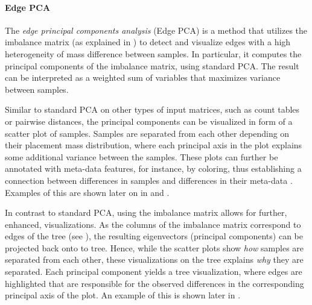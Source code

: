 
\paragraph{Edge PCA}
\label{ch:Foundations:sec:PhylogeneticPlacement:sub:ExistingMethods:par:EdgePCA}


The \emph{edge principal components analysis} (Edge PCA) \cite{Matsen2011a}
is a method that utilizes the imbalance matrix
(as explained in )
to detect and visualize edges with a high heterogeneity of mass difference between samples.
In particular, it computes the principal components of the imbalance matrix, using standard PCA.
The result can be interpreted as a weighted sum of variables that maximizes variance between samples.

Similar to standard PCA on other types of input matrices, such as count tables or pairwise distances,
the principal components can be visualized in form of a scatter plot of samples.
Samples are separated from each other depending on their placement mass distribution,
where each principal axis in the plot explains some additional variance between the samples.
These plots can further be annotated with meta-data features, for instance, by coloring,
thus establishing a connection between differences in samples and differences in their meta-data \cite{Srinivasan2012}.
Examples of this are shown later on in  and .

In contrast to standard PCA, using the imbalance matrix allows for further, enhanced, visualizations.
As the columns of the imbalance matrix correspond to edges of the tree
(see ),
the resulting eigenvectors (principal components) can be projected back onto to tree.
Hence, while the scatter plots show \emph{how} samples are separated from each other,
these visualizations on the tree explains \emph{why} they are separated.
Each principal component yields a tree visualization,
where edges are highlighted that are responsible for the observed differences
in the corresponding principal axis of the plot.
An example of this is shown later in .

